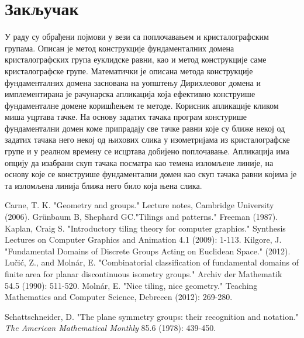 \documentclass[12pt]{article}
\begin{document}
\newpage

\section {Закључак}
У раду су обрађени појмови у вези са поплочавањем и кристалографским групама. Описан је метод конструкције фундаменталних домена кристалографских група еуклидске равни, као и метод конструкције саме кристалографске групе. Математички је описана метода конструкције фундаменталних домена заснована на уопштењу Дирихлеовог домена и имплементирана је рачунарска апликација која ефективно конструише фундаменталне домене коришћењем те методе. Корисник апликације кликом миша уцртава тачке. На основу задатих тачака програм констурише фундаментални домен коме припрадају све тачке равни које су ближе некој од задатих тачака него некој од њихових слика у изометријама из кристалографске групе и у реалном времену се исцртава добијено поплочавање. Апликација има опцију да изабрани скуп тачака посматра као темена изломљене линије, на основу које се конструише фундаментални домен као скуп тачака равни којима је та изломљена линија ближа него било која њена слика. 


\newpage


\renewcommand\bibname{Литература}
\begin{thebibliography}{}

  Carne, T. K.  "Geometry and groups." Lecture notes, Cambridge University (2006). 
Grünbaum B, Shephard GC."Tilings and patterns." Freeman (1987).
   Kaplan, Craig S. "Introductory tiling theory for computer graphics."{} Synthesis Lectures on Computer Graphics and Animation 4.1 (2009): 1-113. 
   Kilgore, J. "Fundamental Domains of Discrete Groups Acting on Euclidean Space." (2012). 
  Lučić, Z., and Molnár, E. "{}Combinatorial classification of fundamental domains of finite area for planar discontinuous isometry groups." Archiv der Mathematik 54.5 (1990): 511-520.
 Molnár, E. "Nice tiling, nice geometry." Teaching Mathematics and Computer Science, Debrecen (2012): 269-280.


  Schattschneider, D. "The plane symmetry groups: their recognition
  and notation." \emph{The American Mathematical Monthly} 85.6 (1978):
  439-450.



\end{thebibliography}





	
\end{document}
